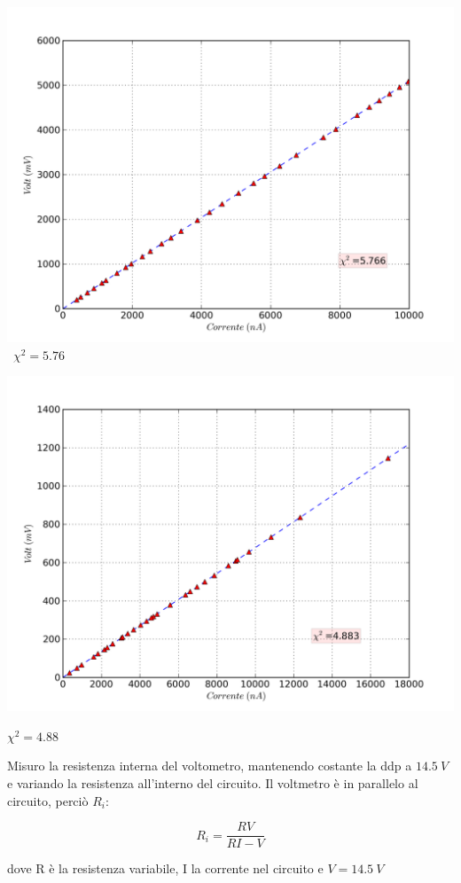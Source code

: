 \includegraphics[scale=0.75]{grafici/C1/res1.png}
\
$\chi^2 = 5.76 $

\includegraphics[scale=0.75]{grafici/C1/res2.png}

$\chi^2 = 4.88 $

Misuro la resistenza interna del voltometro, mantenendo costante la ddp a $14.5\ V$ e variando la resistenza all'interno del circuito. 
Il voltmetro è in parallelo al circuito, perciò $R_i$:

$$R_i = \frac{RV}{RI-V} $$

dove R è la resistenza variabile, I la corrente nel circuito e $V= 14.5\ V$

